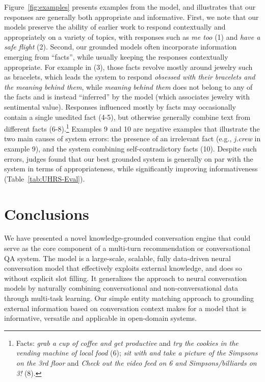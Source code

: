\documentclass[letterpaper]{article}
\begin{document}
Figure~\ref{fig:examples} presents examples from the \MTaskRF model, and illustrates that our responses are generally both appropriate and informative. First, we note that our models preserve the ability of earlier work \cite{sordoni2015,vinyals2015neural} to respond contextually and appropriately on a variety of topics, with responses such as {\it me too} (1) and {\it have a safe flight} (2). Second, our grounded models often incorporate information emerging from ``facts'', while usually keeping the responses contextually appropriate. For example in (3), those facts revolve mostly around jewelry such as bracelets, which leads the system to respond {\it obsessed with their bracelets and the meaning behind them}, while {\it meaning behind them} does not belong to any of the facts and is instead ``inferred'' by the model (which associates jewelry with sentimental value). Responses influenced mostly by facts may occasionally contain a single unedited fact (4-5), but otherwise generally combine text from different facts (6-8).\footnote{Facts: {\it grab a cup of coffee and get productive} and {\it try the cookies in the vending machine of local food} (6); {\it sit with and take a picture of the Simpsons on the 3rd floor} and {\it Check out the video feed on 6 and Simpsons/billiards on 3!} (8).} Examples 9 and 10 are negative examples that illustrate the two main causes of system errors: the presence of an irrelevant fact (e.g., {\it j.crew } in example 9), and the system combining self-contradictory facts (10).  Despite such errors, judges found that our best grounded system is generally on par with the \sts{} system in terms of appropriateness, while significantly improving informativeness (Table~\ref{tab:UHRS-Eval}).

\section{Conclusions}

We have presented a novel knowledge-grounded conversation engine that could serve as the core component of a multi-turn recommendation or conversational QA system.
The model is a large-scale, scalable, fully data-driven neural conversation model that effectively exploits external knowledge, and does so without explicit slot filling.
It generalizes the \sts{} approach to neural conversation models by naturally combining conversational and non-conversational data through multi-task learning.
Our simple entity matching approach to grounding external information based on conversation context makes for a model that is informative, versatile and applicable in open-domain systems.
\end{document}
